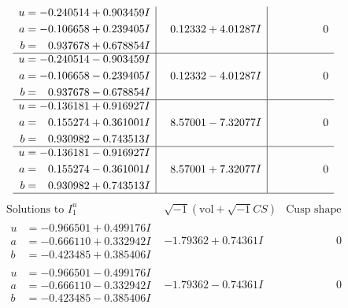 \documentclass[1p]{elsarticle_modified}
\theoremstyle{definition}
\newcommand{\I}{\sqrt{-1}}
\begin{document}
$$\begin{array}{c|c|c}
\begin{aligned}
u &= -0.240514 + 0.903459 I \\
a &= -0.106658 + 0.239405 I \\
b &= \phantom{-}0.937678 + 0.678854 I\end{aligned}
 & \phantom{-}0.12332 + 4.01287 I & \phantom{-0.000000 } 0 \\ \hline\begin{aligned}
u &= -0.240514 - 0.903459 I \\
a &= -0.106658 - 0.239405 I \\
b &= \phantom{-}0.937678 - 0.678854 I\end{aligned}
 & \phantom{-}0.12332 - 4.01287 I & \phantom{-0.000000 } 0 \\ \hline\begin{aligned}
u &= -0.136181 + 0.916927 I \\
a &= \phantom{-}0.155274 + 0.361001 I \\
b &= \phantom{-}0.930982 - 0.743513 I\end{aligned}
 & \phantom{-}8.57001 - 7.32077 I & \phantom{-0.000000 } 0 \\ \hline\begin{aligned}
u &= -0.136181 - 0.916927 I \\
a &= \phantom{-}0.155274 - 0.361001 I \\
b &= \phantom{-}0.930982 + 0.743513 I\end{aligned}
 & \phantom{-}8.57001 + 7.32077 I & \phantom{-0.000000 } 0\\
 \hline 
 \end{array}$$\newpage$$\begin{array}{c|c|c}  
\text{Solutions to }I^u_{1}& \I (\text{vol} + \sqrt{-1}CS) & \text{Cusp shape}\\
 \hline 
\begin{aligned}
u &= -0.966501 + 0.499176 I \\
a &= -0.666110 + 0.332942 I \\
b &= -0.423485 + 0.385406 I\end{aligned}
 & -1.79362 + 0.74361 I & \phantom{-0.000000 } 0 \\ \hline\begin{aligned}
u &= -0.966501 - 0.499176 I \\
a &= -0.666110 - 0.332942 I \\
b &= -0.423485 - 0.385406 I\end{aligned}
 & -1.79362 - 0.74361 I & \phantom{-0.000000 } 0 \\ \hline\begin{aligned}

\end{aligned}
\end{array}$$
\end{document}
